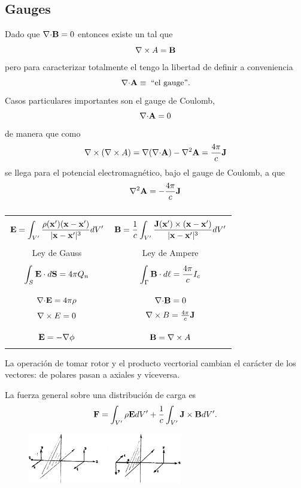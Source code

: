 \documentclass[10pt,oneside]{CBFT_book}
\begin{document}
\subsection{Gauges}

Dado que $\mathbf{\nabla}\mathbf{\cdot}\mathbf{B}=0$ entonces existe un  tal que 
\[
	\rotorm{A} = \vb{B}
\]
pero para caracterizar totalmente el  tengo la libertad de definir a conveniencia
\[
	\mathbf{\nabla}\mathbf{\cdot}\mathbf{A} \equiv \; \textrm{``el gauge''}.
\]
Casos particulares importantes son el gauge de Coulomb,
\[
	\mathbf{\nabla}\mathbf{\cdot}\mathbf{A} = 0
\]
de manera que como 
\[
	\Nabla \times (\rotorm{A}) = \Nabla(\divem{A}) - \lapm{\vb{A}} = \frac{4\pi}{c}\vb{J}
\]
se llega para el potencial electromagnético, bajo el gauge de Coulomb, a que 
\[
	\lapm{\vb{A}} = - \frac{4\pi}{c}\vb{J} 
\]

	\begin{table}[hbt]
	\centering
        \begin{tabular}{|c|c|}
		\hline
		& \\
		$\displaystyle{\vb{E} = \int_{V'} \frac{\rho(\vb{x}')(\vb{x}-\vb{x}')}{|\vb{x}-\vb{x}'|^3} dV' 
		}$ & $\displaystyle{\vb{B} = \frac{1}{c} \int_{V'} \frac{\vb{J}(\vb{x}') \times 
		(\vb{x}-\vb{x}')}{|\vb{x}-\vb{x}'|^3} dV'}$ \\
		& \\
		\hline
		Ley de Gauss & Ley de Ampere \\
		& \\
		$\displaystyle{\int_S \vb{E}\cdot d\vb{S} = 4\pi Q_n}$ &
		$\displaystyle{\int_\Gamma \vb{B}\cdot d\vb{\ell} = \frac{4\pi}{c} I_c}$ \\
		& \\
		\hline
		&\\
		$\mathbf{\nabla}\mathbf{\cdot}\mathbf{E} = 4\pi\rho$ & $\mathbf{\nabla}\mathbf{\cdot}\mathbf{B} = 0$ \\
		$\mathbf{\nabla}\times{E} = 0$ & $\rotorm{B} = \frac{4\pi}{c}\vb{J}$ \\
		& \\
		\hline
		& \\
		$\vb{E} = - \Nabla\phi$ & $\vb{B} = \rotorm{A}$ \\
		& \\
		\hline
        \end{tabular} 
	\caption{}
	\end{table} 

La operación de tomar rotor y el producto vecrtorial cambian el carácter de los vectores: de
polares pasan a axiales y viceversa.

La fuerza general sobre una distribución de carga es
\[
	\vb{F} = \int_{V'} \rho \vb{E} dV' + \frac{1}{c} \int_{V'} \vb{J} \times \vb{B} dV'. 
\]
	

\begin{figure}[htb]
	\begin{center}
	\includegraphics[width=0.6\textwidth]{images/fig_ft1_reflexvect.pdf}	 
	\end{center}
	\caption{}
\end{figure} 

\end{document}

